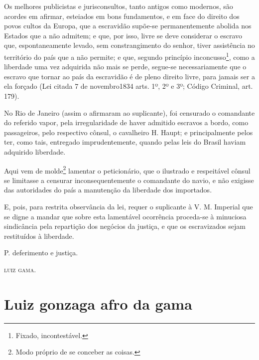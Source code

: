 Os melhores publicistas e jurisconsultos, tanto antigos como modernos,
são acordes em afirmar, esteiados em bons fundamentos, e em face do
direito dos povos cultos da Europa, que a escravidão supõe-se
permanentemente abolida nos Estados que a não admitem; e que, por isso,
livre se deve considerar o escravo que, espontaneamente levado, sem
constrangimento do senhor, tiver assistência no território do país que a
não permite; e que, segundo princípio inconcusso\footnote{ Fixado,
  incontestável.}, como a liberdade uma vez adquirida não mais se perde,
segue-se necessariamente que o escravo que tornar ao país da escravidão
é de pleno direito livre, para jamais ser a ela forçado (Lei citada 7 de
novembro1834 arts. 1º, 2º e 3º; Código Criminal, art. 179).

No Rio de Janeiro (assim o afirmaram ao suplicante), foi censurado o
comandante do referido vapor, pela irregularidade de haver admitido
escravos a bordo, como passageiros, pelo respectivo cônsul, o cavalheiro
H. Haupt; e principalmente pelos ter, como tais, entregado
imprudentemente, quando pelas leis do Brasil haviam adquirido liberdade.

Aqui vem de molde\footnote{ Modo próprio de se conceber as coisas.}
lamentar o peticionário, que o ilustrado e respeitável cônsul se
limitasse a censurar inconsequentemente o comandante do navio, e não
exigisse das autoridades do país a manutenção da liberdade dos
importados.

E, pois, para restrita observância da lei, requer o suplicante à V. M.
Imperial que se digne a mandar que sobre esta lamentável ocorrência
proceda-se à minuciosa sindicância pela repartição dos negócios da
justiça, e que os escravizados sejam restituídos à liberdade.

P. deferimento e justiça.
\begin{flushright}
\textsc{luiz gama}.
\end{flushright}
\part{Luiz gonzaga afro da gama}

